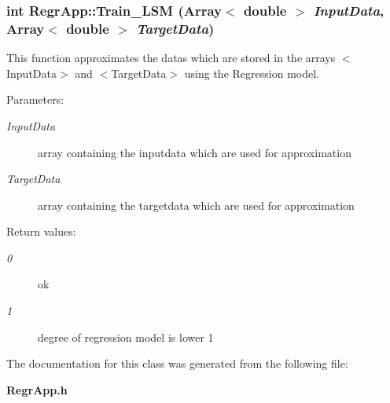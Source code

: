 \subsubsection{\setlength{\rightskip}{0pt plus 5cm}int Regr\-App::Train\_\-LSM (Array$<$ double $>$ {\em Input\-Data}, Array$<$ double $>$ {\em Target\-Data})}\label{classRegrApp_ecec65b3529dac00ecea0d2a64f5b340}


This function approximates the datas which are stored in the arrays $<$Input\-Data$>$ and $<$Target\-Data$>$ using the Regression model. 

\begin{Desc}
\item[Parameters:]
\begin{description}
\item[{\em Input\-Data}]array containing the inputdata which are used for approximation \item[{\em Target\-Data}]array containing the targetdata which are used for approximation \end{description}
\end{Desc}
\begin{Desc}
\item[Return values:]
\begin{description}
\item[{\em 0}]ok \item[{\em 1}]degree of regression model is lower 1 \end{description}
\end{Desc}


The documentation for this class was generated from the following file:\begin{CompactItemize}
\item 
{\bf Regr\-App.h}\end{CompactItemize}
